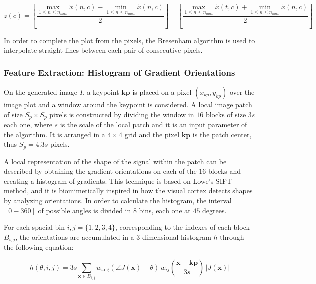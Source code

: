 \documentclass[entropy,article,submit,moreauthors,pdftex,10pt,a4paper]{mdpi}
\begin{document}
\begin{equation}
z(c) = \left \lfloor{ \frac{\max_{1 \leq n\leq n_{max}} \tilde{x}(n,c)  - \min_{1 \leq n\leq n_{max}} \tilde{x}(n,c) }{2} }\right \rfloor -   \left \lfloor{ \frac{\max_{1 \leq n\leq n_{max}} \tilde{x}(t,c)  + \min_{1 \leq n\leq n_{max}} \tilde{x}(n,c)}{ 2} }\right \rfloor
\label{eq:zerolevel}
\end{equation}
  
In order to complete the plot from the pixels, the Bresenham \citep{Bresenham1965,Ramele2016} algorithm is used to interpolate straight lines between each pair of  consecutive pixels.


\subsubsection{Feature Extraction: Histogram of Gradient Orientations}
\label{SIFT}


On the generated image $I$, a keypoint $\mathbf{kp}$ is placed on a pixel $(x_{kp}, y_{kp})$ over the image plot and a window around the keypoint is considered. A local image patch of size $S_p \times S_p$ pixels is constructed by dividing the window in $16$ blocks of size $3s$ each one,  where $s$ is the scale of the local patch and it is an input parameter of the algorithm. It is arranged in a $4 \times 4$ grid and the pixel $ \mathbf{kp}$ is the patch center, thus $S_p = 4.3s $ pixels. 

A local representation of the shape of the signal within the patch can be described by obtaining the gradient orientations on each of the $16$ blocks and creating a histogram of gradients.  This technique is based on Lowe's SIFT~\citep{Lowe2004} method, and it is biomimetically inspired in how the visual cortex detects shapes by analyzing orientations.   In order to calculate the histogram, the interval $[0-360]$ of possible angles is divided in $8$ bins, each one at $45$ degrees.

 For each spacial bin $ i,j = \{1,2,3,4\} $, corresponding to the indexes of each block $B_{i,j}$,  the orientations are accumulated in a  $3$-dimensional histogram $h$ through the following equation: 
 

\begin{equation}
 h(\theta,i,j) = 3s \sum_{\mathbf{x} \in B_{i,j}} w_\mathrm{ang}(\angle J(\mathbf{x}) - \theta)\, w_{ij}\left(\frac{\mathbf{x} - \mathbf{kp}}{3 s}\right)\, |J(\mathbf{x})|
\label{eq:histogram}
\end{equation}
\end{document}
